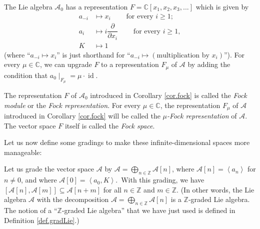 \documentclass[etingof-lie.tex]{subfiles}
\begin{document}
\begin{corollary}
\label{cor.fock}The Lie algebra $\mathcal{A}_{0}$ has a representation
$F=\mathbb{C}\left[  x_{1},x_{2},x_{3},...\right]  $ which is given by
\begin{align*}
a_{-i}  &  \mapsto x_{i}\ \ \ \ \ \ \ \ \ \ \text{for every }i\geq1;\\
a_{i}  &  \mapsto i\dfrac{\partial}{\partial x_{i}}%
\ \ \ \ \ \ \ \ \ \ \text{for every }i\geq1,\\
K  &  \mapsto1
\end{align*}
(where ``$a_{-i}\mapsto x_{i}$'' is just shorthand for ``$a_{-i}\mapsto\left(
\text{multiplication by }x_{i}\right)  $''). For every $\mu\in\mathbb{C}$, we
can upgrade $F$ to a representation $F_{\mu}$ of $\mathcal{A}$ by adding the
condition that $a_{0}\mid_{F_{\mu}}=\mu\cdot\operatorname*{id}$.
\end{corollary}

\begin{definition}
\label{def.fock}The representation $F$ of $\mathcal{A}_{0}$ introduced in
Corollary \ref{cor.fock} is called the \textit{Fock module} or the
\textit{Fock representation}. For every $\mu\in\mathbb{C}$, the representation
$F_{\mu}$ of $\mathcal{A}$ introduced in Corollary \ref{cor.fock} will be
called the $\mu$\textit{-Fock representation} of $\mathcal{A}$. The vector
space $F$ itself is called the \textit{Fock space}.
\end{definition}

Let us now define some gradings to make these infinite-dimensional spaces more manageable:

\begin{definition}
\label{def.A.grad}Let us grade the vector space $\mathcal{A}$ by
$\mathcal{A}=\bigoplus\limits_{n\in\mathbb{Z}}\mathcal{A}\left[  n\right]  $,
where $\mathcal{A}\left[  n\right]  =\left\langle a_{n}\right\rangle $ for
$n\neq0$, and where $\mathcal{A}\left[  0\right]  =\left\langle a_{0}%
,K\right\rangle $.\ With this grading, we have $\left[  \mathcal{A}\left[
n\right]  ,\mathcal{A}\left[  m\right]  \right]  \subseteq\mathcal{A}\left[
n+m\right]  $ for all $n\in\mathbb{Z}$ and $m\in\mathbb{Z}$. (In other words,
the Lie algebra $\mathcal{A}$ with the decomposition $\mathcal{A}%
=\bigoplus\limits_{n\in\mathbb{Z}}\mathcal{A}\left[  n\right]  $ is a
$\mathbb{Z}$-graded Lie algebra. The notion of a ``$\mathbb{Z}$-graded Lie
algebra'' that we have just used is defined in Definition \ref{def.gradLie}.)
\end{definition}
\end{document}
